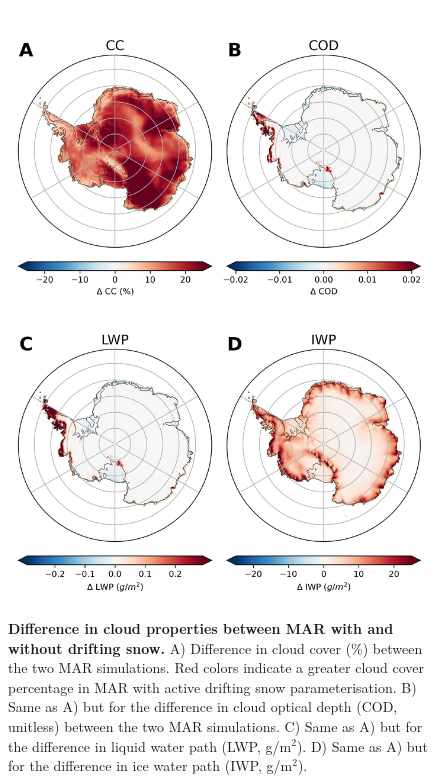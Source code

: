 \documentclass[draft]{agujournal2019}
\begin{document}
\begin{figure}[H]
	\includegraphics[scale=0.7]{microphysics.png}
	\caption{\textbf{Difference in cloud properties between MAR with and without drifting snow.} A) Difference in cloud cover (\%) between the two MAR simulations. Red colors indicate a greater cloud cover percentage in MAR with active drifting snow parameterisation. B) Same as A) but for the difference in cloud optical depth (COD, unitless) between the two MAR simulations. C) Same as A) but for the difference in liquid water path (LWP, g/m$^2$). D) Same as A) but for the difference in ice water path (IWP, g/m$^2$).}
	\label{fig:micro}
\end{figure}
\end{document}
